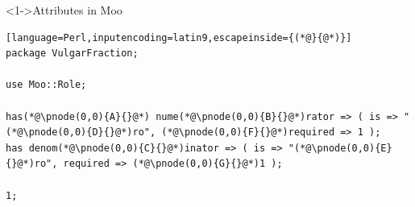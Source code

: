 \documentclass[ngerman,xcolor={table,dvipsnames},scriptsizeer,compress,hyperref={bookmarks,colorlinks}]{beamer}
\begin{document}
\begin{frame}[fragile]

\begin{block}<1->{Attributes in Moo}
\begin{lstlisting}[language=Perl,inputencoding=latin9,escapeinside={(*@}{@*)}]
package VulgarFraction;

use Moo::Role;

has(*@\pnode(0,0){A}{}@*) nume(*@\pnode(0,0){B}{}@*)rator => ( is => "(*@\pnode(0,0){D}{}@*)ro", (*@\pnode(0,0){F}{}@*)required => 1 );
has denom(*@\pnode(0,0){C}{}@*)inator => ( is => "(*@\pnode(0,0){E}{}@*)ro", required => (*@\pnode(0,0){G}{}@*)1 );

1;
\end{lstlisting}
\end{block}

\begin{itemize}
\end{itemize}

\end{frame}
\end{document}
